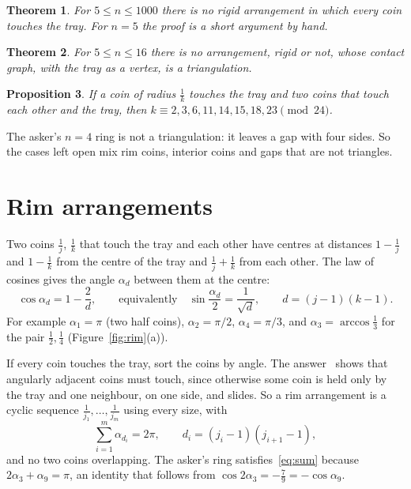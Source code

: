 \documentclass[11pt]{amsart}
\newtheorem{theorem}{Theorem}
\newtheorem{proposition}[theorem]{Proposition}
\theoremstyle{remark}
\begin{document}
\begin{theorem}\label{thm:rim}
For $5\le n\le1000$ there is no rigid arrangement in which every coin touches the tray. For $n=5$ the proof is a short argument by hand.
\end{theorem}

\begin{theorem}\label{thm:tri}
For $5\le n\le16$ there is no arrangement, rigid or not, whose contact graph, with the tray as a vertex, is a triangulation.
\end{theorem}

\begin{proposition}\label{prop:desc}
If a coin of radius $\frac1k$ touches the tray and two coins that touch each other and the tray, then $k\equiv2,3,6,11,14,15,18,23\pmod{24}$.
\end{proposition}

The asker's $n=4$ ring is not a triangulation: it leaves a gap with four sides. So the cases left open mix rim coins, interior coins and gaps that are not triangles.

\section{Rim arrangements}

Two coins $\frac1j$, $\frac1k$ that touch the tray and each other have centres at distances $1-\frac1j$ and $1-\frac1k$ from the centre of the tray and $\frac1j+\frac1k$ from each other. The law of cosines gives the angle $\alpha_d$ between them at the centre:
\begin{equation}\label{eq:alpha}
\cos\alpha_d=1-\frac2d,\qquad\text{equivalently}\quad\sin\frac{\alpha_d}2=\frac1{\sqrt d},\qquad d=(j-1)(k-1).
\end{equation}
For example $\alpha_1=\pi$ (two half coins), $\alpha_2=\pi/2$, $\alpha_4=\pi/3$, and $\alpha_3=\arccos\frac13$ for the pair $\frac12,\frac14$ (Figure~\ref{fig:rim}(a)).

If every coin touches the tray, sort the coins by angle. The answer~\cite{U} shows that angularly adjacent coins must touch, since otherwise some coin is held only by the tray and one neighbour, on one side, and slides. So a rim arrangement is a cyclic sequence $\frac1{j_1},\dots,\frac1{j_m}$ using every size, with
\begin{equation}\label{eq:sum}
\sum_{i=1}^m\alpha_{d_i}=2\pi,\qquad d_i=(j_i-1)(j_{i+1}-1),
\end{equation}
and no two coins overlapping. The asker's ring satisfies~\eqref{eq:sum} because $2\alpha_3+\alpha_9=\pi$, an identity that follows from $\cos2\alpha_3=-\frac79=-\cos\alpha_9$.
\end{document}
